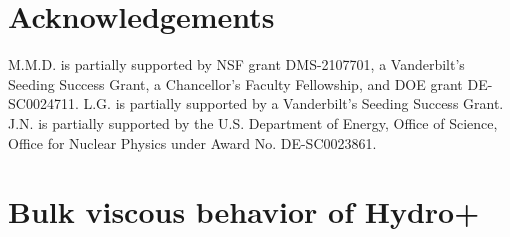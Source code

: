 \documentclass[a4paper, amsfonts, amssymb, amsmath, reprint, showkeys, nofootinbib, twoside, onecolumn,notitlepage]{revtex4-1}
\begin{document}
\section*{Acknowledgements}
M.M.D. is partially supported by NSF grant DMS-2107701, a Vanderbilt's Seeding Success Grant, 
a Chancellor's Faculty Fellowship, and DOE grant DE-SC0024711.
L.G. is partially supported by a Vanderbilt's Seeding Success Grant. J.N. is partially supported by the U.S. Department of Energy, Office of Science, Office for Nuclear Physics
under Award No. DE-SC0023861.


\appendix 


\section{Bulk viscous behavior of Hydro+}\label{AAA}
\end{document}
